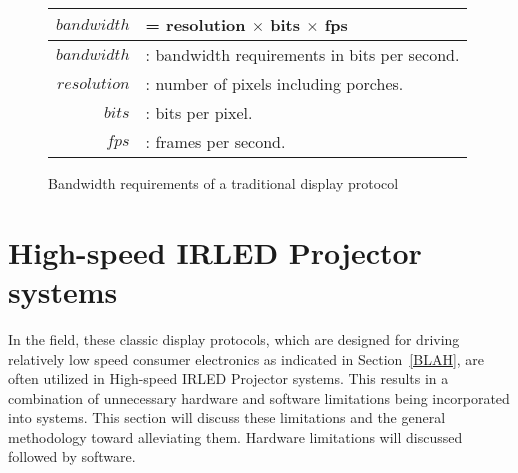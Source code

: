 \begin{figure}
    \centering
    \large
    \begin{tabular}{| r l |}
        \hline
        $$bandwidth$$ & = resolution $\times$ bits $\times$ fps \\ \hline
        $bandwidth$ & : bandwidth requirements in bits per second. \\
        $resolution$ & : number of pixels including porches. \\
        $bits$ & : bits per pixel. \\
        $fps$ & : frames per second. \\
        \hline
    \end{tabular}
    \caption{Bandwidth requirements of a traditional display protocol}
    \label{fig:bandwidth}
\end{figure}

\section{High-speed IRLED Projector systems}
%

In the field, these classic display protocols, which are designed for driving relatively low speed consumer electronics as indicated in Section~\ref{BLAH}, are often utilized in High-speed IRLED Projector systems. This results in a combination of unnecessary hardware and software limitations being incorporated into systems. This section will discuss these limitations and the general methodology toward alleviating them. Hardware limitations will discussed followed by software.

